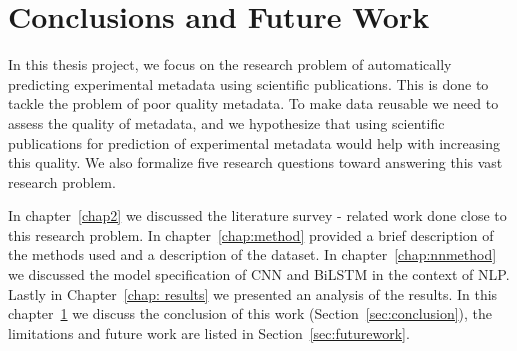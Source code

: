 \chapter{Conclusions and Future Work}\label{conclusion chapter}

In this thesis project, we focus on the research problem of automatically predicting experimental metadata using scientific publications. This is done to tackle the problem of poor quality metadata. To make data reusable we need to assess the quality of metadata, and we hypothesize that using scientific publications for prediction of experimental metadata would help with increasing this quality. We also formalize five research questions toward answering this vast research problem. 

In chapter~\ref{chap2} we discussed the literature survey - related work done close to this research problem. In chapter~\ref{chap:method} provided a brief description of the methods used and a description of the dataset. In chapter~\ref{chap:nnmethod} we discussed the model specification of CNN and BiLSTM in the context of NLP. Lastly in Chapter~\ref{chap: results} we presented an analysis of the results. In this chapter~\ref{conclusion chapter} we discuss the conclusion of this work (Section~\ref{sec:conclusion}), the limitations and future work are listed in Section~\ref{sec:futurework}. 



